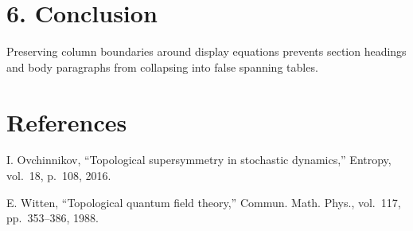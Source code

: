 \documentclass[10pt,twocolumn]{article}
\begin{document}
\section*{6. Conclusion}
Preserving column boundaries around display equations prevents section headings and body paragraphs from collapsing into false spanning tables.

\section*{References}
{\small
\noindent [1] I. Ovchinnikov, ``Topological supersymmetry in stochastic dynamics,'' Entropy, vol.~18, p.~108, 2016.\par\smallskip
\noindent [2] E. Witten, ``Topological quantum field theory,'' Commun. Math. Phys., vol.~117, pp.~353--386, 1988.\par
}
\end{document}
